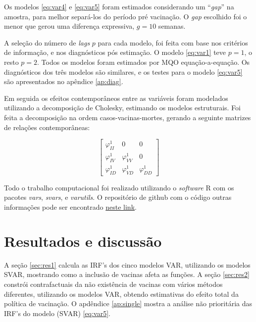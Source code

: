\documentclass[
    article,
	12pt,				%
	oneside,			%
	a4paper,			%
	english,			%
	brazil,				%
	hyperref = {colorlinks, citecolor=c1d, linkcolor=c2d, urlcolor=c3d, colorlinks}
	]{abntex2}
\begin{document}
Os modelos \eqref{eq:var4} e \eqref{eq:var5} foram estimados considerando um ``\textit{gap}'' na amostra, para melhor separá-los do período pré vacinação. O \textit{gap} escolhido foi o menor que gerou uma diferença expressiva, $g = 10$ semanas.

A seleção do número de \textit{lags} $p$ para cada modelo, foi feita com base nos critérios de informação, e nos diagnósticos pós estimação. O modelo \eqref{eq:var1} teve $p = 1$, o resto $p = 2$. Todos os modelos foram estimados por MQO equação-a-equação. Os diagnósticos dos três modelos são similares, e os testes para o modelo \eqref{eq:var5} são apresentados no apêndice \ref{ap:diag}.

Em seguida os efeitos contemporâneos entre as variáveis foram modelados utilizando a decomposição de Cholesky, estimando os modelos estruturais. Foi feita a decomposição na ordem casos-vacinas-mortes, gerando a seguinte matrizes de relações contemporâneas:

\begin{equation}\label{eq:svar}
    \begin{bmatrix}
    \varphi_{II}^1 & 0 & 0 \\
    \varphi_{IV}^1 & \varphi_{VV}^1 & 0 \\
    \varphi_{ID}^1 & \varphi_{VD}^1 & \varphi_{DD}^1
    \end{bmatrix}
\end{equation}

Todo o trabalho computacional foi realizado utilizando o \textit{software} R com os pacotes \textit{vars}, \textit{svars}, e \textit{varutils}. O repositório de github com o código outras informações pode ser encontrado \href{https://github.com/ricardo-semiao/covid-svardiff}{neste link}.



\let\clearpage\relax
\chapter{Resultados e discussão}

A seção \ref{sec:res1} calcula as IRF's dos cinco modelos VAR, utilizando os modelos SVAR, mostrando como a inclusão de vacinas afeta as funções. A seção \ref{sec:res2} constrói contrafactuais da não existência de vacinas com vários métodos diferentes, utilizando os modelos VAR, obtendo estimativas do efeito total da política de vacinação. O apdêndice \ref{ap:single} mostra a análise não prioritária das IRF's do modelo (SVAR) \eqref{eq:var5}.
\end{document}
